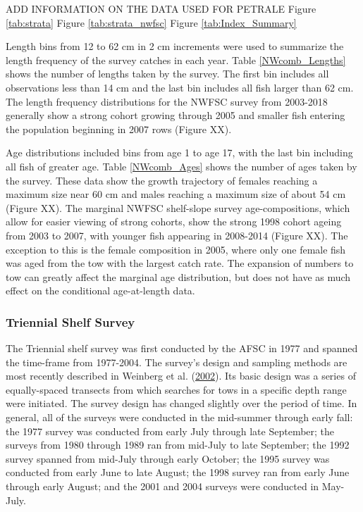 \documentclass[12pt,]{article}
\begin{document}
ADD INFORMATION ON THE DATA USED FOR PETRALE Figure \ref{tab:strata}
Figure \ref{tab:strata_nwfsc} Figure \ref{tab:Index_Summary}

Length bins from 12 to 62 cm in 2 cm increments were used to summarize
the length frequency of the survey catches in each year. Table
\ref{NWcomb_Lengths} shows the number of lengths taken by the survey.
The first bin includes all observations less than 14 cm and the last bin
includes all fish larger than 62 cm. The length frequency distributions
for the NWFSC survey from 2003-2018 generally show a strong cohort
growing through 2005 and smaller fish entering the population beginning
in 2007 rows (Figure XX).

Age distributions included bins from age 1 to age 17, with the last bin
including all fish of greater age. Table \ref{NWcomb_Ages} shows the
number of ages taken by the survey. These data show the growth
trajectory of females reaching a maximum size near 60 cm and males
reaching a maximum size of about 54 cm (Figure XX). The marginal NWFSC
shelf-slope survey age-compositions, which allow for easier viewing of
strong cohorts, show the strong 1998 cohort ageing from 2003 to 2007,
with younger fish appearing in 2008-2014 (Figure XX). The exception to
this is the female composition in 2005, where only one female fish was
aged from the tow with the largest catch rate. The expansion of numbers
to tow can greatly affect the marginal age distribution, but does not
have as much effect on the conditional age-at-length data.

\subsubsection{Triennial Shelf Survey}\label{triennial-shelf-survey}

The Triennial shelf survey was first conducted by the AFSC in 1977 and
spanned the time-frame from 1977-2004. The survey's design and sampling
methods are most recently described in Weinberg et al.
(\protect\hyperlink{ref-weinberg_estimation_2002}{2002}). Its basic
design was a series of equally-spaced transects from which searches for
tows in a specific depth range were initiated. The survey design has
changed slightly over the period of time. In general, all of the surveys
were conducted in the mid-summer through early fall: the 1977 survey was
conducted from early July through late September; the surveys from 1980
through 1989 ran from mid-July to late September; the 1992 survey
spanned from mid-July through early October; the 1995 survey was
conducted from early June to late August; the 1998 survey ran from early
June through early August; and the 2001 and 2004 surveys were conducted
in May-July.
\end{document}
